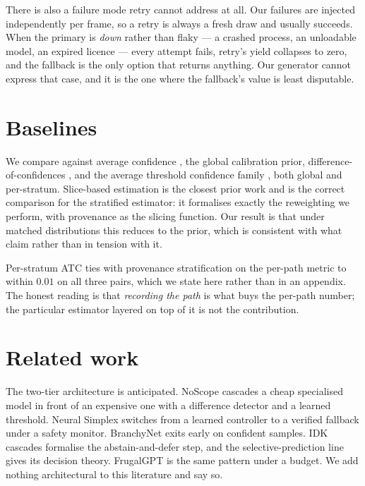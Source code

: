 \documentclass[11pt,a4paper]{article}
\begin{document}
There is also a failure mode retry cannot address at all. Our failures are injected
independently per frame, so a retry is always a fresh draw and usually succeeds.
When the primary is \emph{down} rather than flaky --- a crashed process, an
unloadable model, an expired licence --- every attempt fails, retry's yield
collapses to zero, and the fallback is the only option that returns anything. Our
generator cannot express that case, and it is the one where the fallback's value is
least disputable.

\section{Baselines}

We compare against average confidence \citep{kivimaki2025confidence}, the global
calibration prior, difference-of-confidences \citep{guillory2021doc}, and the
average threshold confidence family \citep{garg2022atc}, both global and
per-stratum. Slice-based estimation \citep{chen2021mandoline} is the closest
prior work and is the correct comparison for the stratified estimator: it
formalises exactly the reweighting we perform, with provenance as the slicing
function. Our result is that under matched distributions this reduces to the
prior, which is consistent with what \citet{chen2021mandoline} claim rather than
in tension with it.

Per-stratum ATC ties with provenance stratification on the per-path metric to
within $0.01$ on all three pairs, which we state here rather than in an appendix.
The honest reading is that \emph{recording the path} is what buys the per-path
number; the particular estimator layered on top of it is not the contribution.

\section{Related work}
\label{sec:related}

The two-tier architecture is anticipated. NoScope \citep{kang2017noscope} cascades
a cheap specialised model in front of an expensive one with a difference detector
and a learned threshold. Neural Simplex \citep{phan2020neuralsimplex} switches
from a learned controller to a verified fallback under a safety monitor.
BranchyNet \citep{teerapittayanon2016branchynet} exits early on confident samples.
IDK cascades \citep{wang2018idk} formalise the abstain-and-defer step, and the
selective-prediction line \citep{chow1970optimum, geifman2017selective} gives its
decision theory. FrugalGPT \citep{chen2023frugalgpt} is the same pattern under a
budget. We add nothing architectural to this literature and say so.
\end{document}
